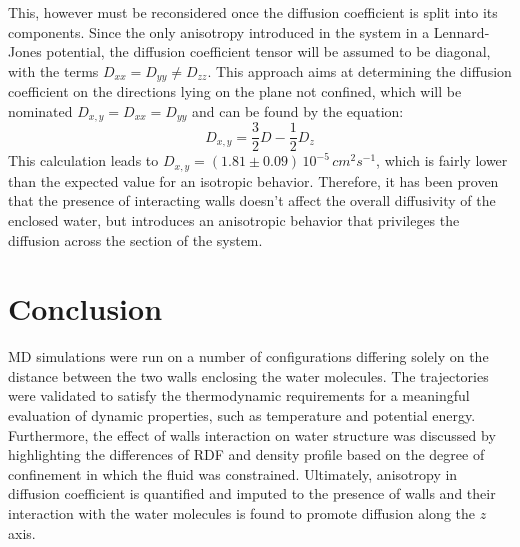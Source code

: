 \documentclass[
	12pt, %
]{fphw}
\begin{document}
This, however must be reconsidered once the diffusion coefficient is split into its components.
Since the only anisotropy introduced in the system in a Lennard-Jones potential, the diffusion coefficient tensor will be assumed to be diagonal, with the terms $D_{xx} = D_{yy} \neq D_{zz}$.
This approach aims at determining the diffusion coefficient on the directions lying on the plane not confined, which will be nominated $D_{x,y} = D_{xx} = D_{yy}$ and can be found by the equation:
\begin{equation}
	D_{x,y} = \frac{3}{2}D - \frac{1}{2}D_{z}
\end{equation}
This calculation leads to $D_{x,y} = (1.81 \pm 0.09)\, 10^{-5} \, cm^{2} s^{-1}$, which is fairly lower than the expected value for an isotropic behavior.
Therefore, it has been proven that the presence of interacting walls doesn't affect the overall diffusivity of the enclosed water, but introduces an anisotropic behavior that privileges the diffusion across the section of the system.
\section*{Conclusion}
MD simulations were run on a number of configurations differing solely on the distance between the two walls enclosing the water molecules.
The trajectories were validated to satisfy the thermodynamic requirements for a meaningful evaluation of dynamic properties, such as temperature and potential energy.
Furthermore, the effect of walls interaction on water structure was discussed by highlighting the differences of RDF and density profile based on the degree of confinement in which the fluid was constrained.
Ultimately, anisotropy in diffusion coefficient is quantified and imputed to the presence of walls and their interaction with the water molecules is found to promote diffusion along the $z$ axis. 


\end{document}
